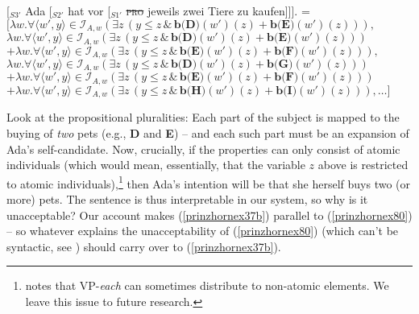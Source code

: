 \documentclass[output=paper]{langscibook}
\begin{document}
\ea
\ea  \label{prinzhornex63a} [$_{S3'}$ Ada [$_{S2'}$ hat vor [$_{S1'}$ \sout{\textsc{pro}} jeweils zwei Tiere zu kaufen]]].
\ex {} = $[\lambda w.  \forall \langle w' ,y \rangle \in \mathcal{I}_{A,w} (\exists  z \,(y \le z\, \& \,\textbf{b(D)}(w')(z)+\textbf{b(E)}(w')(z))),$\\$
\lambda w.  \forall \langle w' ,y \rangle \in \mathcal{I}_{A,w} (\exists  z \,(y \le z\, \& \,\textbf{b(D)}(w')(z)+\textbf{b(E)}(w')(z))) $\\$
+ \lambda w.  \forall \langle w' ,y \rangle \in \mathcal{I}_{A,w} (\exists  z \,(y \le z\, \& \,\textbf{b(E)}(w')(z)+\textbf{b(F)}(w')(z))), $\\$
\lambda w.  \forall \langle w' ,y \rangle \in \mathcal{I}_{A,w} (\exists z\,( y \le z\, \& \,\textbf{b(D)}(w')(z) + \textbf{b(G)}(w')(z)))$\\$ + \lambda w.  \forall \langle w' ,y \rangle \in \mathcal{I}_{A,w} (\exists z \, (y \le z\,\& \,\textbf{b(E)}(w')(z)+\textbf{b(F)}(w')(z))) $\\$ + \lambda w.  \forall \langle w' ,y \rangle \in \mathcal{I}_{A,w} (\exists z \,(y \le z\, \& \,\textbf{b(H)}(w')(z)+\textbf{b(I)}(w')(z))), \dots]$\label{prinzhornex63b}
\z\z

Look at the propositional pluralities: Each part of the subject is mapped  to the buying of \textit{two} pets (e.g., \textbf{D} and \textbf{E}) -- and each such part must be an expansion of Ada's self-candidate. Now, crucially, if the properties can only consist of atomic individuals (which would mean, essentially, that the variable $z$ above is restricted to atomic individuals),\footnote{\citet{Schwarzschild:1996} notes that VP-\textit{each} can sometimes distribute to non-atomic elements. We leave this issue to future research.} then Ada's intention will be that she herself buys two (or more) pets. The sentence is thus interpretable in our system, so why is it unacceptable? Our account makes (\ref{prinzhornex37b}) parallel to (\ref{prinzhornex80}) -- so whatever explains the unacceptability of (\ref{prinzhornex80}) (which can't be syntactic, see ) should carry over to (\ref{prinzhornex37b}).

\ea 
{}
	\z\z
\end{document}
